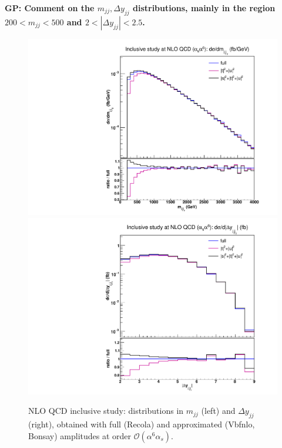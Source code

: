 {\bf GP: Comment on the $m_{jj}, \Delta y_{jj}$ distributions, mainly in the region $200 < m_{jj} < 500$ and $2<|\Delta y_{jj}|<2.5$.}
\begin{figure}[hbt]
\centering
{\includegraphics[scale=0.35]{figures/scanfigures/mjj_nlo.pdf}}
{\includegraphics[scale=0.35]{figures/scanfigures/dyjj_nlo.pdf}}
\caption{NLO QCD inclusive study: distributions in $m_{jj}$ (left) and $\Delta y_{jj}$ (right), obtained with full ({\sc Recola}) and approximated ({\sc Vbfnlo, Bonsay}) amplitudes at order $\mathcal{O}(\alpha^6\alpha_s)$.} \label{fig:mjjdyjj_1d_1}
\end{figure}

